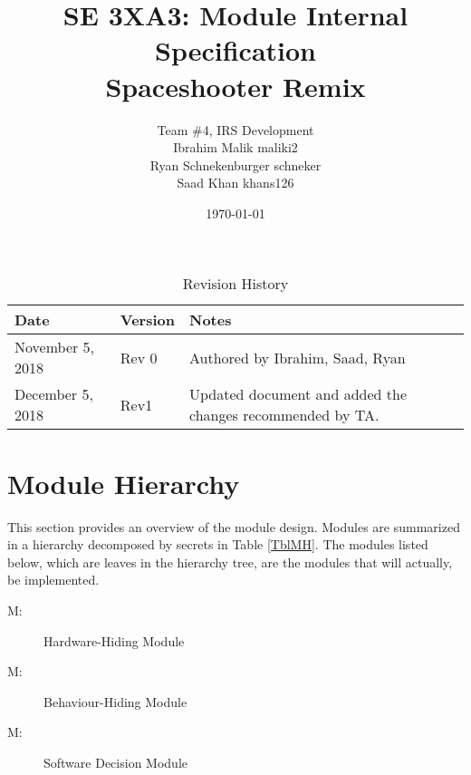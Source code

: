 \documentclass[12pt, titlepage]{article}
\title{SE 3XA3: Module Internal Specification\\Spaceshooter Remix}
\author{Team \#4, IRS Development
		\\ Ibrahim Malik maliki2
		\\ Ryan Schnekenburger schneker
		\\ Saad Khan khans126
}
\date{\today}
\newcounter{mnum}
\newcommand{\mthemnum}{M\themnum}
\begin{document}
\maketitle

\tableofcontents
\listoftables
\listoffigures

\newpage

\begin{table}[hp]
\caption{Revision History} \label{TblRevisionHistory}
\begin{tabularx}{\textwidth}{llX}
\toprule {\bf Date} & {\bf Version} & {\bf Notes}\\
\midrule
November 5, 2018 & Rev 0 & Authored by Ibrahim, Saad, Ryan\\
December 5, 2018 & Rev1 & Updated document and added the changes recommended by TA.\\
\bottomrule
\end{tabularx}
\end{table}

\newpage



\section{Module Hierarchy} \label{SecMH}

This section provides an overview of the module design. Modules are summarized
in a hierarchy decomposed by secrets in Table \ref{TblMH}. The modules listed
below, which are leaves in the hierarchy tree, are the modules that will
actually, be implemented.

\begin{description}
\item [ \mthemnum \label{mHH}:] Hardware-Hiding Module
\item [ \mthemnum \label{mHR}:] Behaviour-Hiding Module
\item [ \mthemnum \label{mHE}:] Software Decision Module
\end{description}
\end{document}
